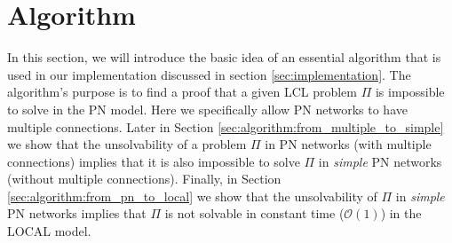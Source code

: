
\section{Algorithm} \label{sec:algorithm}


%
%
%




In this section, we will introduce the basic idea of an essential algorithm that is used in our implementation discussed in section \ref{sec:implementation}.
The algorithm's purpose is to find a proof that a given LCL problem $\Pi$ is impossible to solve in the PN model.
Here we specifically allow PN networks to have multiple connections.
Later in Section \ref{sec:algorithm:from_multiple_to_simple} we show that the unsolvability of a problem $\Pi$ in PN networks (with multiple connections) implies that it is also impossible to solve $\Pi$ in \emph{simple} PN networks (without multiple connections).
Finally, in Section \ref{sec:algorithm:from_pn_to_local} we show that the unsolvability of $\Pi$ in \emph{simple} PN networks implies that $\Pi$ is not solvable in constant time ($\mathcal{O}(1)$) in the LOCAL model.

